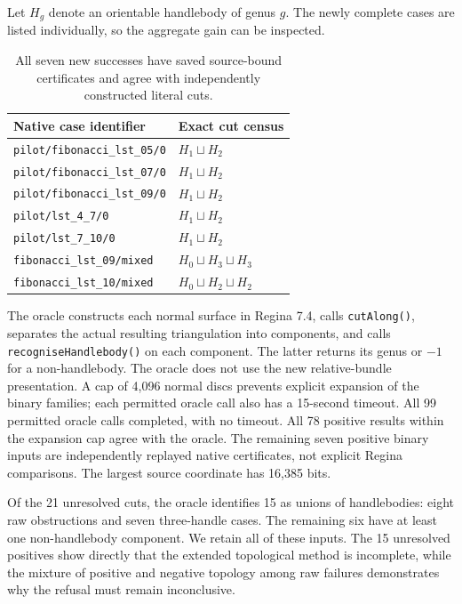 Let $H_g$ denote an orientable handlebody of genus $g$.  The newly complete
cases are listed individually, so the aggregate gain can be inspected.

\begin{table}[htbp]
\centering\small
\begin{tabularx}{\linewidth}{@{}YX@{}}
\toprule
Native case identifier & Exact cut census\\
\midrule
\texttt{pilot/fibonacci\_lst\_05/0} & $H_1\sqcup H_2$\\
\texttt{pilot/fibonacci\_lst\_07/0} & $H_1\sqcup H_2$\\
\texttt{pilot/fibonacci\_lst\_09/0} & $H_1\sqcup H_2$\\
\texttt{pilot/lst\_4\_7/0} & $H_1\sqcup H_2$\\
\texttt{pilot/lst\_7\_10/0} & $H_1\sqcup H_2$\\
\texttt{fibonacci\_lst\_09/mixed} & $H_0\sqcup H_3\sqcup H_3$\\
\texttt{fibonacci\_lst\_10/mixed} & $H_0\sqcup H_2\sqcup H_2$\\
\bottomrule
\end{tabularx}
\caption{All seven new successes have saved source-bound certificates and
agree with independently constructed literal cuts.}
\end{table}

The oracle constructs each normal surface in Regina 7.4, calls
\texttt{cutAlong()}, separates the actual resulting triangulation into
components, and calls \texttt{recogniseHandlebody()} on each component.
The latter returns its genus or $-1$ for a non-handlebody\cite{ReginaAPI}.
The oracle does not use the new relative-bundle presentation.  A cap of
4,096 normal discs prevents explicit expansion of the binary families;
each permitted oracle call also has a 15-second timeout.  All 99 permitted
oracle calls completed, with no timeout.  All 78 positive results within
the expansion cap agree with the oracle.  The remaining seven positive
binary inputs are independently replayed native certificates, not explicit
Regina comparisons.  The largest source coordinate has 16,385 bits.

Of the 21 unresolved cuts, the oracle identifies 15 as unions of
handlebodies: eight raw obstructions and seven three-handle cases.  The
remaining six have at least one non-handlebody component.  We retain all
of these inputs.  The 15 unresolved positives show directly that the
extended topological method is incomplete, while the mixture of positive
and negative topology among raw failures demonstrates why the refusal
must remain inconclusive.

